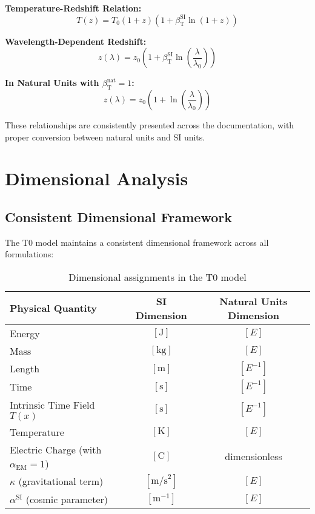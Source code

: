 \documentclass[a4paper,11pt]{article}
\newcommand{\Tfield}{T(x)}
\newcommand{\betaT}{\beta_{\text{T}}}
\newcommand{\alphaEM}{\alpha_{\text{EM}}}
\begin{document}
	\begin{tcolorbox}[colback=blue!5!white, colframe=blue!75!black, title=Cosmological Equations]
		\textbf{Temperature-Redshift Relation:}
		\begin{equation}
			T(z) = T_0 (1+z)(1+\betaT^{\text{SI}} \ln(1+z))
		\end{equation}
		
		\textbf{Wavelength-Dependent Redshift:}
		\begin{equation}
			z(\lambda) = z_0 \left(1 + \betaT^{\text{SI}} \ln\left(\frac{\lambda}{\lambda_0}\right)\right)
		\end{equation}
		
		\textbf{In Natural Units with $\betaT^{\text{nat}} = 1$:}
		\begin{equation}
			z(\lambda) = z_0 \left(1 + \ln\left(\frac{\lambda}{\lambda_0}\right)\right)
		\end{equation}
	\end{tcolorbox}
	
	These relationships are consistently presented across the documentation, with proper conversion between natural units and SI units.
	
	\section{Dimensional Analysis}
	
	\subsection{Consistent Dimensional Framework}
	
	The T0 model maintains a consistent dimensional framework across all formulations:
	
	\begin{table}[h]
		\centering
		\begin{tabular}{lcc}
			\toprule
			\textbf{Physical Quantity} & \textbf{SI Dimension} & \textbf{Natural Units Dimension} \\
			\midrule
			Energy & $[\text{J}]$ & $[E]$ \\
			Mass & $[\text{kg}]$ & $[E]$ \\
			Length & $[\text{m}]$ & $[E^{-1}]$ \\
			Time & $[\text{s}]$ & $[E^{-1}]$ \\
			Intrinsic Time Field $\Tfield$ & $[\text{s}]$ & $[E^{-1}]$ \\
			Temperature & $[\text{K}]$ & $[E]$ \\
			Electric Charge (with $\alphaEM = 1$) & $[\text{C}]$ & dimensionless \\
			$\kappa$ (gravitational term) & $[\text{m/s}^2]$ & $[E]$ \\
			$\alpha^{\text{SI}}$ (cosmic parameter) & $[\text{m}^{-1}]$ & $[E]$ \\
			\bottomrule
		\end{tabular}
		\caption{Dimensional assignments in the T0 model}
	\end{table}
	
\end{document}

